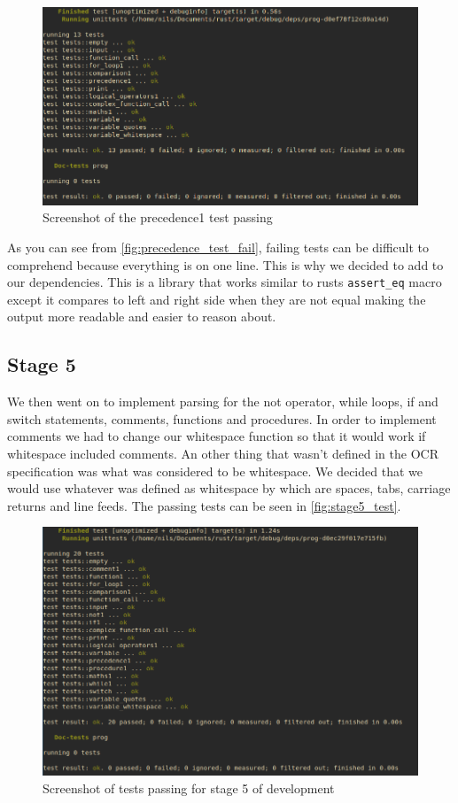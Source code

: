 \documentclass{article}
\begin{document}
\begin{figure}
	\includegraphics[width=\textwidth]{precedence_test_pass}
	\caption{Screenshot of the precedence1 test passing}
	\label{fig:precedence_test_pass}
\end{figure}

As you can see from \autoref{fig:precedence_test_fail}, failing tests can be
difficult to comprehend because everything is on one line. This is why we
decided to add  to our dependencies. This is
a library that works similar to rusts \texttt{assert\_eq} macro except it
compares to left and right side when they are not equal making the output more
readable and easier to reason about.

\subsection{Stage 5}

We then went on to implement parsing for the not operator, while loops, if and
switch statements, comments, functions and procedures. In order to implement
comments we had to change our whitespace function so that it would work if
whitespace included comments. An other thing that wasn't defined in the OCR
specification was what was considered to be whitespace. We decided that we
would use whatever was defined as whitespace by  which are
spaces, tabs, carriage returns and line feeds. The passing tests can be seen
in \autoref{fig:stage5_test}.

\begin{figure}
	\includegraphics[width=\textwidth]{stage5_test}
	\caption{Screenshot of tests passing for stage 5 of development}
	\label{fig:stage5_test}
\end{figure}
\end{document}

